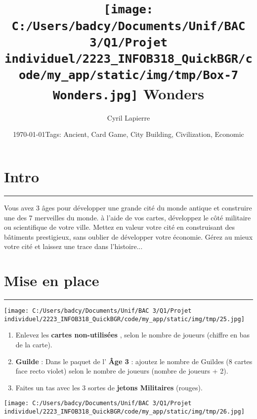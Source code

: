 \documentclass{scrartcl}%
\title{\texttt{[image: C:/Users/badcy/Documents/Unif/BAC 3/Q1/Projet individuel/2223\_INFOB318\_QuickBGR/code/my\_app/static/img/tmp/Box-7 Wonders.jpg]}\break 7 Wonders }%
\author{Cyril Lapierre}%
\date{\today \break Tags: Ancient, Card Game, City Building, Civilization, Economic}%
\begin{document}
%
\normalsize%
\maketitle\thispagestyle{header}%
\pagestyle{header}%
\sectionfont{\color{blue}}%
\subsectionfont{\color{blue}}%
\subsubsectionfont{\color{blue}}%
\section{ Intro
}%
\label{sec:Intro}%
\textcolor{blue}{\rule{18cm}{0.07cm}}\break%
Vous avez 3 âges pour développer une grande cité du monde antique et construire une des 7 merveilles du
%
monde. à l’aide de vos cartes, développez le côté militaire ou scientifique de votre ville. Mettez en valeur
%
votre cité en construisant des bâtiments prestigieux, sans oublier de développer votre économie.
%
Gérez au mieux votre cité et laissez une trace dans l'histoire...


%
\sectionfont{\color{mygreen}}%
\subsectionfont{\color{mygreen}}%
\subsubsectionfont{\color{mygreen}}%
\section{ Mise en place
}%
\label{sec:Miseenplace}%
\textcolor{mygreen}{\rule{18cm}{0.07cm}}\break%
%
\begin{center}\texttt{[image: C:/Users/badcy/Documents/Unif/BAC 3/Q1/Projet individuel/2223\_INFOB318\_QuickBGR/code/my\_app/static/img/tmp/25.jpg]}\end{center}%

%

%
\begin{enumerate}%
\item%
%
 Enlevez les %
\textcolor{mygreen}{%
\textbf{cartes non{-}utilisées}%
}%
, selon le nombre de joueurs (chiffre en bas de la carte).
%
\item%
%
\textcolor{mygreen}{%
\textbf{Guilde}%
}%
\textit{ }%
 : Dans le paquet de l'%
\textcolor{mygreen}{%
\textbf{Âge 3}%
}%
\textit{ }%
 : ajoutez le nombre de Guildes (8 cartes face recto violet) selon le nombre de joueurs (nombre de joueurs + 2).
%
\item%
%
 Faites un tas avec les 3 sortes de %
\textcolor{mygreen}{%
\textbf{jetons Militaires}%
}%
\textit{ }%
 (rouges).
%
\end{enumerate}%
%
\begin{center}\texttt{[image: C:/Users/badcy/Documents/Unif/BAC 3/Q1/Projet individuel/2223\_INFOB318\_QuickBGR/code/my\_app/static/img/tmp/26.jpg]}\end{center}%
\end{document}
